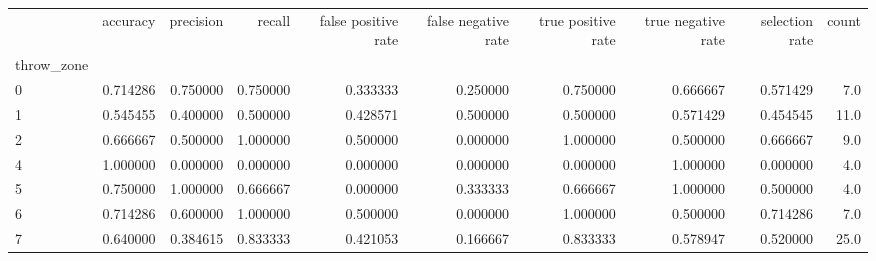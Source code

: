 \begin{tabular}{lrrrrrrrrr}
\toprule
{} &  accuracy &  precision &    recall &  false positive rate &  false negative rate &  true positive rate &  true negative rate &  selection rate &  count \\
throw\_zone &           &            &           &                      &                      &                     &                     &                 &        \\
\midrule
0          &  0.714286 &   0.750000 &  0.750000 &             0.333333 &             0.250000 &            0.750000 &            0.666667 &        0.571429 &    7.0 \\
1          &  0.545455 &   0.400000 &  0.500000 &             0.428571 &             0.500000 &            0.500000 &            0.571429 &        0.454545 &   11.0 \\
2          &  0.666667 &   0.500000 &  1.000000 &             0.500000 &             0.000000 &            1.000000 &            0.500000 &        0.666667 &    9.0 \\
4          &  1.000000 &   0.000000 &  0.000000 &             0.000000 &             0.000000 &            0.000000 &            1.000000 &        0.000000 &    4.0 \\
5          &  0.750000 &   1.000000 &  0.666667 &             0.000000 &             0.333333 &            0.666667 &            1.000000 &        0.500000 &    4.0 \\
6          &  0.714286 &   0.600000 &  1.000000 &             0.500000 &             0.000000 &            1.000000 &            0.500000 &        0.714286 &    7.0 \\
7          &  0.640000 &   0.384615 &  0.833333 &             0.421053 &             0.166667 &            0.833333 &            0.578947 &        0.520000 &   25.0 \\
\bottomrule
\end{tabular}

